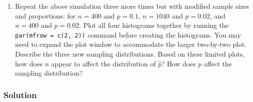 \documentclass[]{article}
\providecommand{\tightlist}{%
  \setlength{\itemsep}{0pt}\setlength{\parskip}{0pt}}
\begin{document}
\begin{enumerate}
\def\labelenumi{\arabic{enumi}.}
\setcounter{enumi}{9}
\tightlist
\item
  Repeat the above simulation three more times but with modified sample
  sizes and proportions: for \(n = 400\) and \(p = 0.1\), \(n = 1040\)
  and \(p = 0.02\), and \(n = 400\) and \(p = 0.02\). Plot all four
  histograms together by running the \texttt{par(mfrow\ =\ c(2,\ 2))}
  command before creating the histograms. You may need to expand the
  plot window to accommodate the larger two-by-two plot. Describe the
  three new sampling distributions. Based on these limited plots, how
  does \(n\) appear to affect the distribution of \(\hat{p}\)? How does
  \(p\) affect the sampling distribution?
\end{enumerate}

\subsubsection{Solution}\label{solution-9}
\end{document}
